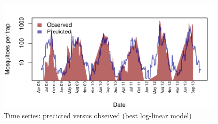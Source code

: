 \documentclass{article}
\begin{document}
\vspace{-3mm}
\begin{figure}[H]
\begin{center}  
\includegraphics{mosquitoRainTempArticle-012}

\caption{Time series: predicted versus observed (best log-linear model)}
\end{center}
\end{figure}

\newpage
\end{document}
